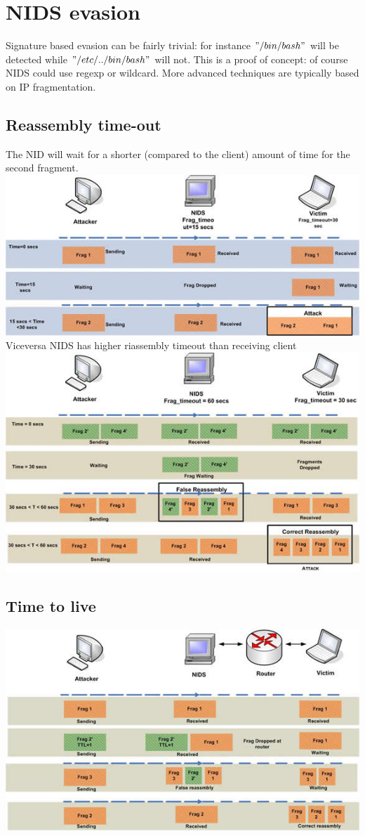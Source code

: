 \documentclass[10pt,a4paper]{book}
\begin{document}
\section{NIDS evasion}
Signature based evasion can be fairly trivial: for instance $"/bin/bash"$ will be detected while $"/etc/../bin/bash"$ will not. This is a proof of concept: of course NIDS could use regexp or wildcard. More advanced techniques are typically based on IP fragmentation.
\subsection{Reassembly time-out}
The NID will wait for a shorter (compared to the client) amount of time for the second fragment.
\includegraphics{IDS-evasion/1.jpg}\\
Viceversa NIDS has higher riassembly timeout than receiving client\\
\includegraphics{IDS-evasion/2.jpg}
\subsection{Time to live}
\includegraphics{IDS-evasion/3.jpg}
\end{document}
